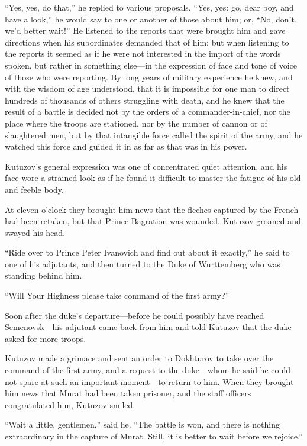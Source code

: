 ``Yes, yes, do that,'' he replied to various proposals. ``Yes,
yes: go, dear boy, and have a look,'' he would say to one or
another of those about him; or, ``No, don't, we'd better wait!''
He listened to the reports that were brought him and gave
directions when his subordinates demanded that of him; but when
listening to the reports it seemed as if he were not interested
in the import of the words spoken, but rather in something
else---in the expression of face and tone of voice of those who
were reporting. By long years of military experience he knew, and
with the wisdom of age understood, that it is impossible for one
man to direct hundreds of thousands of others struggling with
death, and he knew that the result of a battle is decided not by
the orders of a commander-in-chief, nor the place where the
troops are stationed, nor by the number of cannon or of
slaughtered men, but by that intangible force called the spirit
of the army, and he watched this force and guided it in as far as
that was in his power.

Kutuzov's general expression was one of concentrated quiet
attention, and his face wore a strained look as if he found it
difficult to master the fatigue of his old and feeble body.

At eleven o'clock they brought him news that the fleches captured
by the French had been retaken, but that Prince Bagration was
wounded. Kutuzov groaned and swayed his head.

``Ride over to Prince Peter Ivanovich and find out about it
exactly,'' he said to one of his adjutants, and then turned to
the Duke of Wurttemberg who was standing behind him.

``Will Your Highness please take command of the first army?''

Soon after the duke's departure---before he could possibly have
reached Semenovsk---his adjutant came back from him and told
Kutuzov that the duke asked for more troops.

Kutuzov made a grimace and sent an order to Dokhturov to take
over the command of the first army, and a request to the
duke---whom he said he could not spare at such an important
moment---to return to him. When they brought him news that Murat
had been taken prisoner, and the staff officers congratulated
him, Kutuzov smiled.

``Wait a little, gentlemen,'' said he. ``The battle is won, and
there is nothing extraordinary in the capture of Murat. Still, it
is better to wait before we rejoice.''

